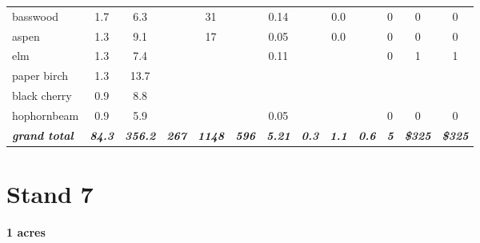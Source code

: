 \documentclass[landscape]{article}
\begin{document}
\begin{table}[H]
\begin{tabular}[t]{lcccccccccccc}
basswood & 1.7 & 6.3 &  & 31 &  & 0.14 &  & 0.0 &  & 0 & 0 & 0\\
 
\rowcolor{gray!6}  aspen & 1.3 & 9.1 &  & 17 &  & 0.05 &  & 0.0 &  & 0 & 0 & 0\\
 
elm & 1.3 & 7.4 &  &  &  & 0.11 &  &  &  & 0 & 1 & 1\\
 
\rowcolor{gray!6}  paper birch & 1.3 & 13.7 &  &  &  &  &  &  &  &  &  & \\
 
black cherry & 0.9 & 8.8 &  &  &  &  &  &  &  &  &  & \\
 
\rowcolor{gray!6}  hophornbeam & 0.9 & 5.9 &  &  &  & 0.05 &  &  &  & 0 & 0 & 0\\
 
\rowcolor[HTML]{DCDCDC}  \em{\textbf{grand total}} & \em{\textbf{84.3}} & \em{\textbf{356.2}} & \em{\textbf{267}} & \em{\textbf{1148}} & \em{\textbf{596}} & \em{\textbf{5.21}} & \em{\textbf{0.3}} & \em{\textbf{1.1}} & \em{\textbf{0.6}} & \em{\textbf{5}} & \em{\textbf{\$325}} & \em{\textbf{\$325}}\\
\bottomrule
\end{tabular}
\end{table}

\pagebreak

\section{Stand 7}\label{stand-7}

\textbf{1 acres}
\end{document}
